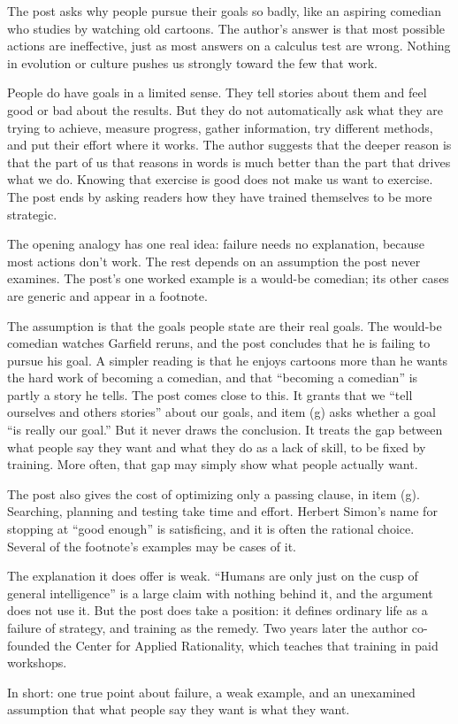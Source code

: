 \begin{afterword}
\summaryhead

The post asks why people pursue their goals so badly, like an aspiring comedian who studies by watching old cartoons. The author's answer is that most possible actions are ineffective, just as most answers on a calculus test are wrong. Nothing in evolution or culture pushes us strongly toward the few that work.

People do have goals in a limited sense. They tell stories about them and feel good or bad about the results. But they do not automatically ask what they are trying to achieve, measure progress, gather information, try different methods, and put their effort where it works. The author suggests that the deeper reason is that the part of us that reasons in words is much better than the part that drives what we do. Knowing that exercise is good does not make us want to exercise. The post ends by asking readers how they have trained themselves to be more strategic.

\responsehead

The opening analogy has one real idea: failure needs no explanation, because most actions don't work. The rest depends on an assumption the post never examines. The post's one worked example is a would-be comedian; its other cases are generic and appear in a footnote.

The assumption is that the goals people state are their real goals. The would-be comedian watches Garfield reruns, and the post concludes that he is failing to pursue his goal. A simpler reading is that he enjoys cartoons more than he wants the hard work of becoming a comedian, and that ``becoming a comedian'' is partly a story he tells. The post comes close to this. It grants that we ``tell ourselves and others stories'' about our goals, and item (g) asks whether a goal ``is really our goal.'' But it never draws the conclusion. It treats the gap between what people say they want and what they do as a lack of skill, to be fixed by training. More often, that gap may simply show what people actually want.

The post also gives the cost of optimizing only a passing clause, in item (g). Searching, planning and testing take time and effort. Herbert Simon's name for stopping at ``good enough'' is satisficing, and it is often the rational choice. Several of the footnote's examples may be cases of it.

The explanation it does offer is weak. ``Humans are only just on the cusp of general intelligence'' is a large claim with nothing behind it, and the argument does not use it. But the post does take a position: it defines ordinary life as a failure of strategy, and training as the remedy. Two years later the author co-founded the Center for Applied Rationality, which teaches that training in paid workshops.

In short: one true point about failure, a weak example, and an unexamined assumption that what people say they want is what they want.
\end{afterword}
